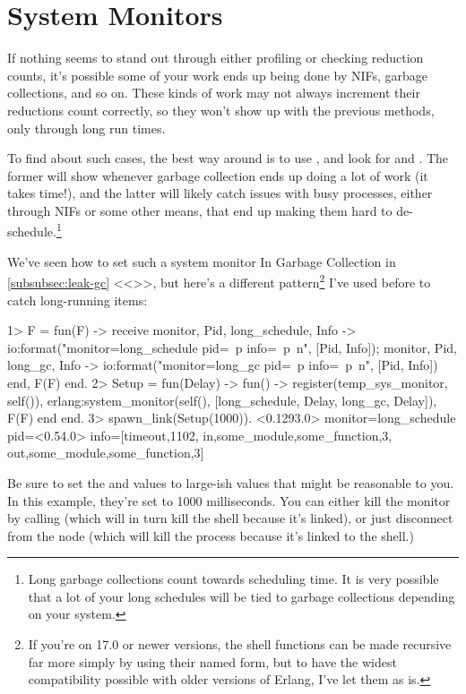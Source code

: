 \documentclass[11pt, oneside]{book}   	%
\newcommand\NamedRef[1]{\ref{#1} <<\nameref{#1}>>}
\begin{document}
\section{System Monitors}
\label{sec:cpu-system-monitors}

If nothing seems to stand out through either profiling or checking reduction counts, it's possible some of your work ends up being done by NIFs, garbage collections, and so on. These kinds of work may not always increment their reductions count correctly, so they won't show up with the previous methods, only through long run times.

To find about such cases, the best way around is to use , and look for  and . The former will show whenever garbage collection ends up doing a lot of work (it takes time!), and the latter will likely catch issues with busy processes, either through NIFs or some other means, that end up making them hard to de-schedule.\footnote{Long garbage collections count towards scheduling time. It is very possible that a lot of your long schedules will be tied to garbage collections depending on your system.}

We've seen how to set such a system monitor In Garbage Collection in \NamedRef{subsubsec:leak-gc}, but here's a different pattern\footnote{If you're on 17.0 or newer versions, the shell functions can be made recursive far more simply by using their named form, but to have the widest compatibility possible with older versions of Erlang, I've let them as is.} I've used before to catch long-running items:

\begin{VerbatimEshell}
1> F = fun(F) ->
    receive
        {monitor, Pid, long_schedule, Info} ->
            io:format("monitor=long_schedule pid=~p info=~p~n", [Pid, Info]);
        {monitor, Pid, long_gc, Info} -> 
            io:format("monitor=long_gc pid=~p info=~p~n", [Pid, Info])
    end,
    F(F)
end.
2> Setup = fun(Delay) -> fun() -> 
     register(temp_sys_monitor, self()),
     erlang:system_monitor(self(), [{long_schedule, Delay}, {long_gc, Delay}]),
     F(F)
end end.
3> spawn_link(Setup(1000)).
<0.1293.0>
monitor=long_schedule pid=<0.54.0> info=[{timeout,1102},
                                         {in,{some_module,some_function,3}},
                                         {out,{some_module,some_function,3}}]
\end{VerbatimEshell}

Be sure to set the  and  values to large-ish values that might be reasonable to you. In this example, they're set to 1000 milliseconds. You can either kill the monitor by calling  (which will in turn kill the shell because it's linked), or just disconnect from the node (which will kill the process because it's linked to the shell.)
\end{document}
